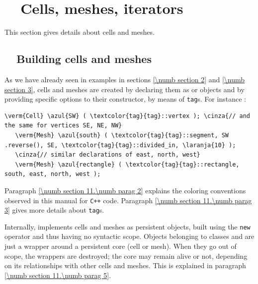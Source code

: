 
\chapter{~~Cells, meshes, iterators}\label{\numb section 9}


This section gives details about cells and meshes.

\section{~~Building cells and meshes}\label{\numb section 9.\numb parag 1}

As we have already seen in examples in sections \ref{\numb section 2} and \ref{\numb section 3},
cells and meshes are created by declaring them as {\small\tt {}} or
{\small\tt {}} objects
and by providing specific options to their constructor, by means of {\small\tt\textcolor{tag}{tag}}s.
For instance :

\begin{Verbatim}[commandchars=\\\{\},formatcom=\small\tt,
   baselinestretch=0.94,framesep=2mm                      ]
   \verm{Cell} \azul{SW} ( \textcolor{tag}{tag}::vertex ); \cinza{// and the same for vertices SE, NE, NW}
   \verm{Mesh} \azul{south} ( \textcolor{tag}{tag}::segment, SW .reverse(), SE, \textcolor{tag}{tag}::divided_in, \laranja{10} );
   \cinza{// similar declarations of east, north, west}
   \verm{Mesh} \azul{rectangle} ( \textcolor{tag}{tag}::rectangle, south, east, north, west );
\end{Verbatim}

Paragraph \ref{\numb section 11.\numb parag 2} explains the coloring conventions observed
in this manual for {\tt C++} code.
Paragraph \ref{\numb section 11.\numb parag 3} gives more details about
{\small\tt\textcolor{tag}{tag}}s.

Internally, {\maniFEM} implements cells and meshes as persistent objects, built
using the {\small\tt new} operator and thus having no syntactic scope.
Objects belonging to classes {\small\tt {}} and {\small\tt {}} are just a wrapper
around a persistent core (cell or mesh).
When they go out of scope, the wrappers are destroyed; the core may remain alive or not,
depending on its relationships with other cells and meshes.
This is explained in paragraph \ref{\numb section 11.\numb parag 5}.

